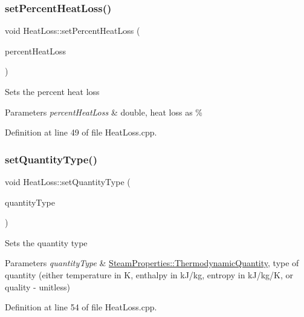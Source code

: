 \subsubsection{\texorpdfstring{set\+Percent\+Heat\+Loss()}{setPercentHeatLoss()}}
{\footnotesize\ttfamily void Heat\+Loss\+::set\+Percent\+Heat\+Loss (\begin{DoxyParamCaption}\item[{double}]{percent\+Heat\+Loss }\end{DoxyParamCaption})}

Sets the percent heat loss 
\begin{DoxyParams}{Parameters}
{\em percent\+Heat\+Loss} & double, heat loss as \% \\
\hline
\end{DoxyParams}


Definition at line 49 of file Heat\+Loss.\+cpp.

\mbox{\label{class_heat_loss_a7c125f1137f31eba8826a1aa3b905290}} 
\subsubsection{\texorpdfstring{set\+Quantity\+Type()}{setQuantityType()}}
{\footnotesize\ttfamily void Heat\+Loss\+::set\+Quantity\+Type (\begin{DoxyParamCaption}\item[{\hyperlink{class_steam_properties_ae0294bedf7d178c2d8fb6aed0f62fbff}{Steam\+Properties\+::\+Thermodynamic\+Quantity}}]{quantity\+Type }\end{DoxyParamCaption})}

Sets the quantity type 
\begin{DoxyParams}{Parameters}
{\em quantity\+Type} & \hyperlink{class_steam_properties_ae0294bedf7d178c2d8fb6aed0f62fbff}{Steam\+Properties\+::\+Thermodynamic\+Quantity}, type of quantity (either temperature in K, enthalpy in k\+J/kg, entropy in k\+J/kg/K, or quality -\/ unitless) \\
\hline
\end{DoxyParams}


Definition at line 54 of file Heat\+Loss.\+cpp.

\mbox{\label{class_heat_loss_ae6b6c4ac28471d7bc94e3886c48a90bd}} 
